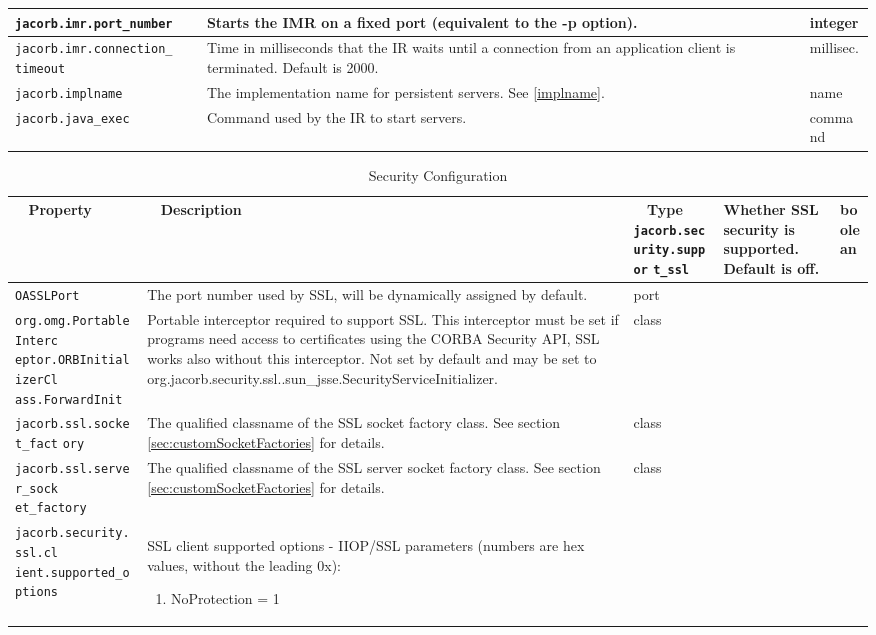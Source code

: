 {{\begin{small}
\begin{longtable}{|p{5cm}|p{9cm}|p{2cm}|}
\hline
\verb"jacorb.imr.port_number" & Starts the IMR on a fixed port (equivalent to the -p option). & integer \\
\hline
\verb"jacorb.imr.connection_"
\verb"timeout" & Time in milliseconds that the IR waits until a connection from an application client is terminated. Default is 2000. & millisec. \\
\hline
\verb"jacorb.implname" & The implementation name for persistent servers. See \ref{implname}. & name \\
\hline
\verb"jacorb.java_exec" & Command used by the IR to start servers. & command \\
\hline

\end{longtable}
\end{small}


\begin{small}
\begin{longtable}{|p{5cm}|p{9cm}|p{2cm}|}
\caption{Security Configuration}\\
\hline
~ \hfill \textbf {Property} \hfill ~ & ~ \hfill \textbf {Description} \hfill ~ & ~ \hfill \textbf {Type} \hfill ~ \endhead
\hline
\verb"jacorb.security.suppor"
\verb"t_ssl" & Whether SSL security is supported. Default is off. & boolean \\
\hline
\verb"OASSLPort" & The port number used by SSL, will be dynamically assigned by default. & port \\
\hline
\verb"org.omg.PortableInterc"
\verb"eptor.ORBInitializerCl"
\verb"ass.ForwardInit" & Portable interceptor required to support SSL. This interceptor must be set if programs need access to certificates using the CORBA Security API, SSL works also without this interceptor. Not set by default and may be set to org.jacorb.security.ssl..sun\_jsse.SecurityServiceInitializer. & class \\
\hline
\verb"jacorb.ssl.socket_fact"
\verb"ory" & The qualified classname of the SSL socket factory class. See section \ref{sec:customSocketFactories} for details.& class \\
\hline
\verb"jacorb.ssl.server_sock"
\verb"et_factory" & The qualified classname of the SSL server socket factory class. See section \ref{sec:customSocketFactories} for details.& class \\
\hline
\verb"jacorb.security.ssl.cl"
\verb"ient.supported_options" & SSL client supported options - IIOP/SSL parameters (numbers are hex values, without the leading 0x):
\begin{enumerate}
\item NoProtection = 1

\end{enumerate}
\end{longtable}
\end{small}}}
